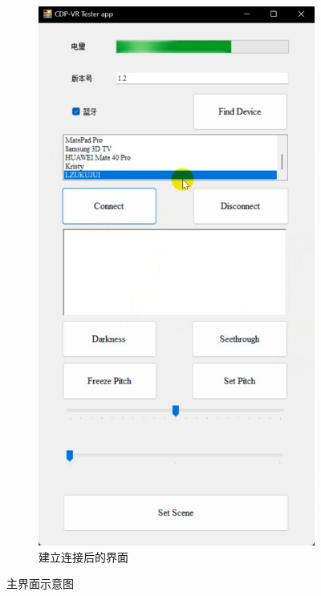 \documentclass[a4paper,10pt]{article}
\begin{document}
\begin{figure}[htbp]
\begin{subfigure}{0.23\textwidth}
				\includegraphics[width=0.98\linewidth]{picture/VertiVR-CDP Tester Connect}
				\captionsetup{font=scriptsize}
				\caption{建立连接后的界面}
				\label{fig:vertivr-cdp-tester-connect}
			\end{subfigure}
			\caption{
				\label{fig: PC Main menu}	
				主界面示意图				
			}
		\end{figure}
	
\end{document}
